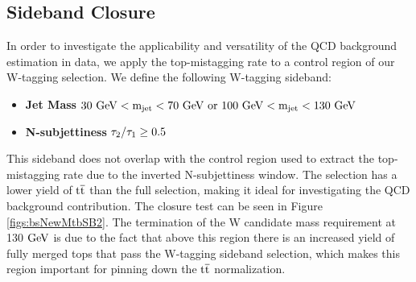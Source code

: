 \subsection{Sideband Closure}
\label{sec:bssecondsideband}
In order to investigate the applicability and versatility of the QCD background estimation in data, we apply the top-mistagging rate to a control region of our 
W-tagging selection.  We define the following W-tagging sideband:

\begin{itemize}
\item {\bf Jet Mass}  $\mathrm{\boldmath 30~\mathrm{GeV} < m_{\text{jet}} < 70~\mathrm{GeV}~or~100~\mathrm{GeV} < m_{\text{jet}} < 130~\mathrm{GeV} }$ 
\item {\bf N-subjettiness} $\mathrm{\boldmath \tau_2/\tau_1 \geq 0.5}$ 
\end{itemize}
This sideband does not overlap with the control region used to extract the top-mistagging rate due to the inverted N-subjettiness window.
The selection has a lower yield of $\mathrm{t\overline{t}}$ than the full selection, making it ideal for investigating the QCD background contribution.  
The closure test can be seen in Figure \ref{figs:bsNewMtbSB2}.  The termination of the W candidate mass requirement at 130 $\mathrm{GeV}$ is due to the fact that
above this region there is an increased yield of fully merged tops that pass the W-tagging sideband selection, which makes this region important for pinning 
down the $\mathrm{t\overline{t}}$ normalization.

